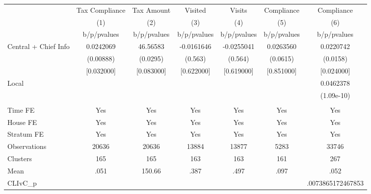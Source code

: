 {
\def\sym#1{\ifmmode^{#1}\else\(^{#1}\)\fi}
\begin{tabular}{l*{6}{c}}
\toprule
                &\multicolumn{1}{c}{Tax Compliance}&\multicolumn{1}{c}{Tax Amount}&\multicolumn{1}{c}{Visited}&\multicolumn{1}{c}{Visits}&\multicolumn{1}{c}{Compliance}&\multicolumn{1}{c}{Compliance}\\
                &\multicolumn{1}{c}{(1)}&\multicolumn{1}{c}{(2)}&\multicolumn{1}{c}{(3)}&\multicolumn{1}{c}{(4)}&\multicolumn{1}{c}{(5)}&\multicolumn{1}{c}{(6)}\\
                &b/p/pvalues&b/p/pvalues&b/p/pvalues&b/p/pvalues&b/p/pvalues&b/p/pvalues\\
\midrule
Central + Chief Info&0.0242069& 46.56583&-0.0161646&-0.0255041&0.0263560&0.0220742\\
                &(0.00888)& (0.0295)&  (0.563)&  (0.564)& (0.0615)& (0.0158)\\
                &[0.032000]&[0.083000]&[0.622000]&[0.619000]&[0.851000]&[0.024000]\\
Local           &         &         &         &         &         &0.0462378\\
                &         &         &         &         &         &(1.09e-10)\\
                &         &         &         &         &         &         \\
Time FE         &      Yes&      Yes&      Yes&      Yes&      Yes&      Yes\\
House FE        &      Yes&      Yes&      Yes&      Yes&      Yes&      Yes\\
Stratum FE      &      Yes&      Yes&      Yes&      Yes&      Yes&      Yes\\
\midrule
Observations    &    20636&    20636&    13884&    13877&     5283&    33746\\
Clusters        &      165&      165&      163&      163&      161&      267\\
Mean            &     .051&   150.66&     .387&     .497&     .097&     .052\\
CLIvC\_p         &         &         &         &         &         &.0073865172467853\\
\bottomrule
\end{tabular}
}
